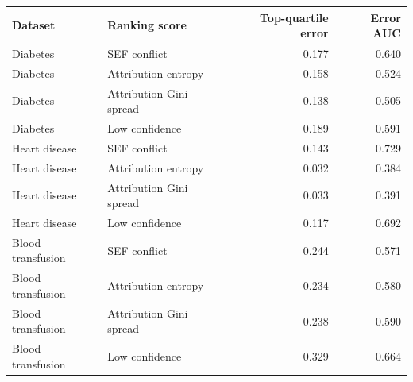 \begin{tabular}{llrr}
\toprule
Dataset & Ranking score & Top-quartile error & Error AUC \\
\midrule
Diabetes & SEF conflict & 0.177 & 0.640 \\
Diabetes & Attribution entropy & 0.158 & 0.524 \\
Diabetes & Attribution Gini spread & 0.138 & 0.505 \\
Diabetes & Low confidence & 0.189 & 0.591 \\
Heart disease & SEF conflict & 0.143 & 0.729 \\
Heart disease & Attribution entropy & 0.032 & 0.384 \\
Heart disease & Attribution Gini spread & 0.033 & 0.391 \\
Heart disease & Low confidence & 0.117 & 0.692 \\
Blood transfusion & SEF conflict & 0.244 & 0.571 \\
Blood transfusion & Attribution entropy & 0.234 & 0.580 \\
Blood transfusion & Attribution Gini spread & 0.238 & 0.590 \\
Blood transfusion & Low confidence & 0.329 & 0.664 \\
\bottomrule
\end{tabular}
